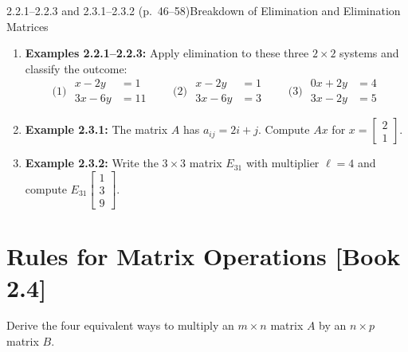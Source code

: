 \documentclass[11pt,a4paper,openany,oneside]{book}
\def\vect#1{#1}%
\def\mathbf#1{#1}%
\def\bk#1{ [Book #1]}%
\newcommand{\vect}[1]{\mathbf{#1}}
\numberwithin{equation}{chapter}
\newcommand{\bk}[1]{\texorpdfstring{\enspace{\normalfont\small\color{slate}[Book #1]}}{ [Book #1]}}
\begin{document}
\begin{example}{2.2.1--2.2.3 and 2.3.1--2.3.2 (p.\ 46--58)}{Breakdown of Elimination and Elimination Matrices}
\begin{enumerate}
\item \textbf{Examples 2.2.1--2.2.3:} Apply elimination to these three $2\times 2$ systems and classify the outcome:
\[
\text{(1) } \begin{aligned} x - 2y &= 1 \\ 3x - 6y &= 11 \end{aligned} \qquad
\text{(2) } \begin{aligned} x - 2y &= 1 \\ 3x - 6y &= 3 \end{aligned} \qquad
\text{(3) } \begin{aligned} 0x + 2y &= 4 \\ 3x - 2y &= 5 \end{aligned}
\]
\item \textbf{Example 2.3.1:} The matrix $A$ has $a_{ij} = 2i + j$. Compute $A\vect{x}$ for $\vect{x} = \begin{bmatrix}2\\1\end{bmatrix}$.
\item \textbf{Example 2.3.2:} Write the $3\times 3$ matrix $E_{31}$ with multiplier $\ell = 4$ and compute $E_{31}\begin{bmatrix}1\\3\\9\end{bmatrix}$.
\end{enumerate}
\end{example}

\section{Rules for Matrix Operations\bk{2.4}}

\begin{goal}
Derive the four equivalent ways to multiply an $m\times n$ matrix $A$ by an $n\times p$ matrix $B$.
\end{goal}
\end{document}
